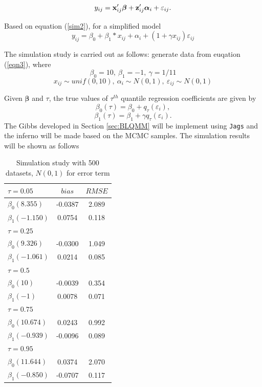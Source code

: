 \documentclass[12pt]{article}
\begin{document}
\begin{equation}\label{eqn:sim1} 
y_{ij}={\bf x}_{ij}'\boldsymbol{\beta}+{\bf z}_{ij}'\boldsymbol{\alpha}_i+\varepsilon_{ij}.\end{equation} 

Based on equation (\ref{sim2}), for a simplified model 
\begin{equation}\label{eqn3} 
y_{ij}=\beta_0+\beta_1*x_{ij}+\alpha_i+ (1+\gamma x_{ij})\varepsilon_{ij}
\end{equation}

The simulation study is carried out as follows: generate data from euqation (\ref{eqn3}), where \[\beta_0=10,\ \beta_1=-1,\ \gamma=1/11\]
\[x_{ij}\sim unif(0,10),\ \alpha_i\sim N(0,1),\ \varepsilon_{ij}\sim N(0,1)\] 

 Given $\boldsymbol{\beta}$ and $\tau$, the true values of $\tau^{th}$ quantile regression coefficients are given by 
\[{\beta}_0(\tau)=\beta_0+q_{\tau}(\varepsilon_i),\] 
\[\beta_1(\tau)=\beta_1+\gamma q_{\tau}(\varepsilon_i).\]
The Gibbs developed in Section \ref{sec:BLQMM} will be implement using \verb'Jags' and the inferno will be made based on the MCMC samples. The simulation results will be shown as follows

\begin{table}[H]
\caption{Simulation study with 500 datasets, $N(0,1)$ for error term}
\centering
\begin{tabular}{lcc}
\hline
$\tau=0.05$&$bias$&$RMSE$\\
\hline
$\beta_0(8.355)$& -0.0387 & 2.089 \\
$\beta_1(-1.150)$& 0.0754 & 0.118 \\
\hline
\hline
$\tau=0.25$&&\\
$\beta_0(9.326)$& -0.0300 & 1.049 \\
$\beta_1(-1.061)$& 0.0214 & 0.085 \\
\hline
\hline
$\tau=0.5$&&\\
$\beta_0(10)$& -0.0039 & 0.354 \\
$\beta_1(-1)$& 0.0078 & 0.071\\
\hline
\hline
$\tau=0.75$&&\\
$\beta_0(10.674)$& 0.0243 & 0.992 \\
$\beta_1(-0.939)$& -0.0096 & 0.089 \\
\hline
\hline
$\tau=0.95$&&\\
$\beta_0(11.644)$& 0.0374 & 2.070 \\
$\beta_1(-0.850)$& -0.0707 & 0.117 \\
\hline
\end{tabular}
\end{table}
\end{document}
